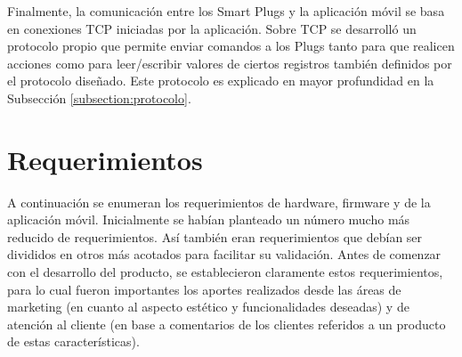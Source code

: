 Finalmente, la comunicación entre los Smart Plugs y la aplicación móvil se basa en conexiones TCP iniciadas por la aplicación. Sobre TCP se desarrolló un protocolo propio que permite enviar comandos a los Plugs tanto para que realicen acciones como para leer/escribir valores de ciertos registros también definidos por el protocolo diseñado. Este protocolo es explicado en mayor profundidad en la Subsección \ref{subsection:protocolo}.



\section{Requerimientos}
\label{sec:requerimientos}

A continuación se enumeran los requerimientos de hardware, firmware y de la aplicación móvil. Inicialmente se habían planteado un número mucho más reducido de requerimientos. Así también eran requerimientos que debían ser divididos en otros más acotados para facilitar su validación. Antes de comenzar con el desarrollo del producto, se establecieron claramente estos requerimientos, para lo cual fueron importantes los aportes realizados desde las áreas de marketing (en cuanto al aspecto estético y funcionalidades deseadas) y de atención al cliente (en base a comentarios de los clientes referidos a un producto de estas características).

